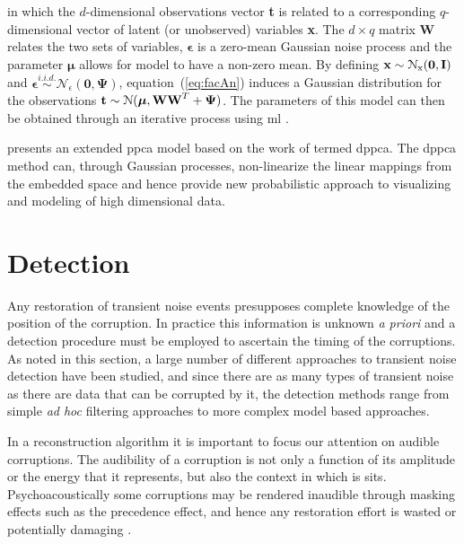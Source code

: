 in which the $d$-dimensional observations vector \textbf{t} is related to a corresponding $q$-dimensional vector of latent (or unobserved) variables \textbf{x}. The $d \times q$ matrix \textbf{W} relates the two sets of variables, $\boldsymbol\epsilon$ is a zero-mean Gaussian noise process and the parameter $\boldsymbol\mu$ allows for model to have a non-zero mean. By defining $\textrm{\textbf{x}} \sim \mathcal{N}_\textrm{x}(\boldsymbol0,\textrm{\textbf{I}})$ and $\boldsymbol\epsilon \stackrel{i.i.d.}{\sim} \mathcal{N}_\epsilon(\boldsymbol0,\boldsymbol\Psi)$, equation~(\ref{eq:facAn}) induces a Gaussian distribution for the observations $\textrm{\textbf{t}} \sim \mathcal{N}(\boldsymbol\mu,\textrm{\textbf{W}}\textrm{\textbf{W}}^T + \boldsymbol\Psi)$. The parameters of this model can then be obtained through an iterative process using \gls{ml} \citep{Tipping1999}.

 \cite{Lawrence2005} presents an extended \gls{ppca} model based on the work of \cite{Tipping1999} termed \gls{dppca}. The \gls{dppca} method can, through Gaussian processes, non-linearize the linear mappings from the embedded space and hence provide new probabilistic approach to visualizing and modeling of high dimensional data.



\section{Detection}\label{sec:LitRev_Detection}
Any restoration of transient noise events presupposes complete knowledge of the position of the corruption. In practice this information is unknown \emph{a priori} and a detection procedure must be employed to ascertain the timing of the corruptions. As noted in this section, a large number of different approaches to transient noise detection have been studied, and since there are as many types of transient noise as there are data that can be corrupted by it, the detection methods range from simple \emph{ad hoc} filtering approaches to more complex model based approaches.

In a reconstruction algorithm it is important to focus our attention on audible corruptions. The audibility of a corruption is not only a function of its amplitude or the energy that it represents, but also the context in which is sits. Psychoacoustically some corruptions may be rendered inaudible through masking effects such as the precedence effect, and hence any restoration effort is wasted or potentially damaging \cite{Moore2003}.

